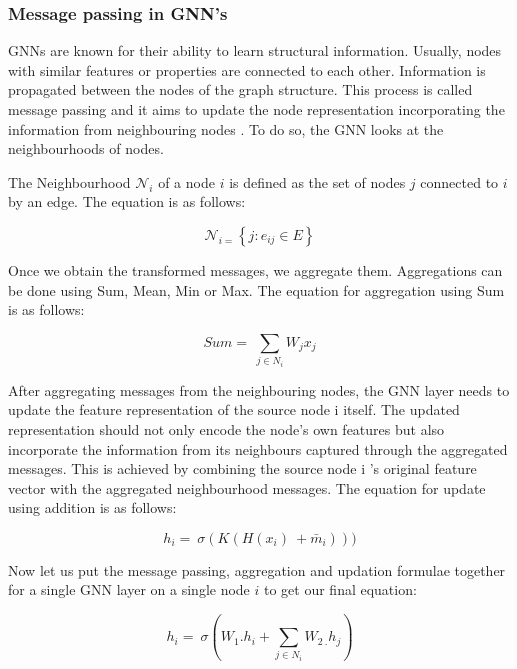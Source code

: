 \documentclass[pdflatex,sn-mathphys-num]{sn-jnl}%
\begin{document}
\subsubsection{Message passing in GNN’s}\label{subsubsec3}

GNNs are known for their ability to learn structural information. Usually, nodes with similar features or properties are connected to each other. Information is propagated between the nodes of the graph structure. This process is called message passing and it aims to update the node representation incorporating the information from neighbouring nodes \cite{anand2022}. To do so, the GNN looks at the neighbourhoods of nodes.

The Neighbourhood $\mathcal{N}_i$ of a node $i$ is defined as the set of nodes $j$ connected to $i$ by an edge. The equation is as follows:

\begin{equation}
\mathcal{N}_{i =} \left\{ j : e_{ij} \in E \right\}
\end{equation}

Once we obtain the transformed messages, we aggregate them. Aggregations can be done using Sum, Mean, Min or Max. The equation for aggregation using Sum is as follows:

\begin{equation}
Sum=\ \sum_{j\in N_i} W_jx_j
\end{equation}

After aggregating messages from the neighbouring nodes, the GNN layer needs to update the feature representation of the source node i itself. The updated representation should not only encode the node's own features but also incorporate the information from its neighbours captured through the aggregated messages. This is achieved by combining the source node i 's original feature vector with the aggregated neighbourhood messages.
The equation for update using addition is as follows:

\begin{equation}
h_i=\ \sigma(K(H(x_i)\ +\bar{m}_i )))
\end{equation}


Now let us put the message passing, aggregation and updation formulae together for a single GNN layer on a single node $i$ to get our final equation:

\begin{equation}
h_i=\ \sigma(W_1.h_i+\sum_{j\in N_i} W_{2\ .}h_j)
\end{equation}
\end{document}
